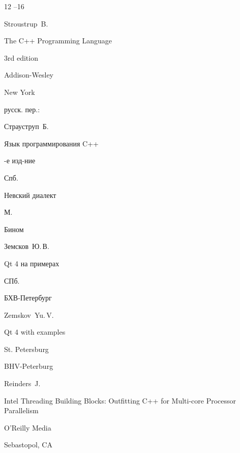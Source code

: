 \begin{thebibliography}{12}
--16






\by Stroustrup~B.

\book The C++ Programming Language

\edition 3rd edition

\publ Addison-Wesley

\publaddr New York



\rtransl русск. пер.:~

\by Страуструп~Б.

\book Язык программирования C++

-е изд-ние

\publaddr Спб.

\publ Невский диалект

\publaddrr М.

\publl Бином






\by  Земсков~Ю.\,В.

\book Qt 4 на примерах

\publaddr СПб.

\publ БХВ-Петербург



\misctransl

\by Zemskov~Yu.\,V.

\book Qt 4 with examples

\publaddr St. Petersburg

\publ BHV-Peterburg






\by Reinders~J.

\book Intel Threading Building Blocks: Outfitting C++ for Multi-core Processor Parallelism

\publ O'Reilly Media


\publaddr Sebastopol, CA





\end{thebibliography}
